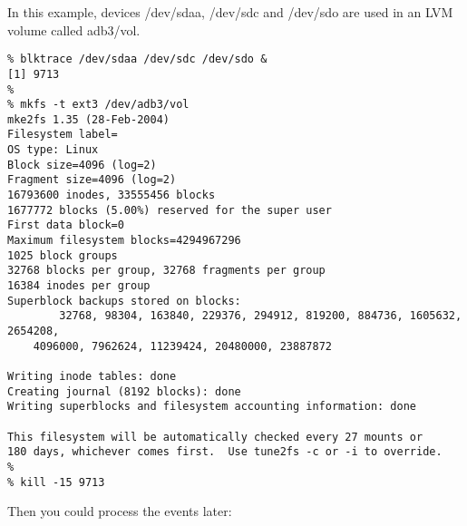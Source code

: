 \documentclass{article}
\begin{document}
In this example, devices /dev/sdaa, /dev/sdc and /dev/sdo are used in an 
LVM volume called adb3/vol.

\begin{verbatim}
% blktrace /dev/sdaa /dev/sdc /dev/sdo &
[1] 9713
%
% mkfs -t ext3 /dev/adb3/vol
mke2fs 1.35 (28-Feb-2004)
Filesystem label=
OS type: Linux
Block size=4096 (log=2)
Fragment size=4096 (log=2)
16793600 inodes, 33555456 blocks
1677772 blocks (5.00%) reserved for the super user
First data block=0
Maximum filesystem blocks=4294967296
1025 block groups
32768 blocks per group, 32768 fragments per group
16384 inodes per group
Superblock backups stored on blocks: 
        32768, 98304, 163840, 229376, 294912, 819200, 884736, 1605632, 2654208, 
	4096000, 7962624, 11239424, 20480000, 23887872

Writing inode tables: done                            
Creating journal (8192 blocks): done
Writing superblocks and filesystem accounting information: done

This filesystem will be automatically checked every 27 mounts or
180 days, whichever comes first.  Use tune2fs -c or -i to override.
%
% kill -15 9713
\end{verbatim}

Then you could process the events later:
\end{document}
